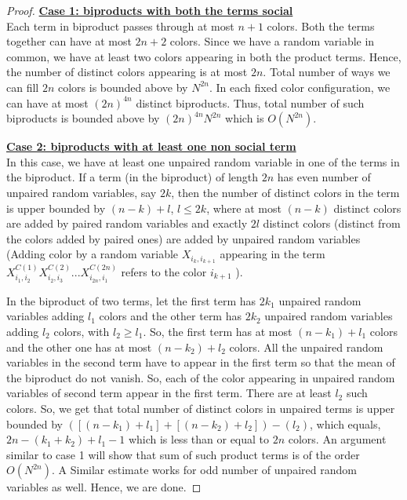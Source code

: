 \documentclass[12pt]{amsart}
\theoremstyle{definition}
\theoremstyle{remark}
\begin{document}
\begin{proof}
\textbf{\underline{Case 1: biproducts with both the terms social}}\\
Each term in biproduct passes through at most $n+1$ colors. Both the terms together can have at most $2n+2$ colors. Since we have a random variable in common, we have at least two colors appearing in both the product terms. Hence, the number of distinct colors appearing is at most $2n$. Total number of ways we can fill $2n$ colors is bounded above by $N^{2n}$. In each fixed color configuration, we can have at most $(2n)^{4n}$ distinct biproducts. Thus, total number of such biproducts is bounded above by $(2n)^{4n}N^{2n}$ which is $O(N^{2n})$.\par
\textbf{\underline{Case 2: biproducts with at least one non social term}}\\
In this case, we have at least one unpaired random variable in one of the terms in the biproduct. If a term (in the biproduct) of length $2n$ has even number of unpaired random variables, say $2k$, then the number of distinct colors in the term is upper bounded by $(n-k) + l$, $l \leq 2k$, where at most $(n-k)$ distinct colors are added by paired random variables and exactly $2l$ distinct colors (distinct from the colors added by paired ones) are added by unpaired random variables (Adding color by a random variable $X_{i_k,i_{k+1}}$ appearing in the term $X_{i_1,i_2}^{C(1)}X_{i_2,i_3}^{C(2)}...X_{i_{2n},i_{1}}^{C(2n)}$ refers to the color $i_{k+1}$ ). \par
In the biproduct of two terms, let the first term has $2k_1$ unpaired random variables adding $l_1$ colors and the other term has $2k_2$ unpaired random variables adding $l_2$ colors, with $l_2 \geq l_1$. So, the first term has at most $(n-k_1)+l_1$ colors and the other one has at most $(n-k_2)+l_2$ colors. All the unpaired random variables in the second term have to appear in the first term so that the mean of the biproduct do not vanish. So, each of the color appearing in unpaired random variables of second term appear in the first term. There are at least $l_2$ such colors. So, we get that total number of distinct colors in unpaired terms is upper bounded by $([(n-k_1)+l_1]+[(n-k_2)+l_2]) - (l_2)$, which equals, $2n-(k_1+k_2)+l_1-1$ which is less than or equal to $2n$ colors. An argument similar to case 1 will show that sum of such product terms is of the order $O(N^{2n})$. A Similar estimate works for odd number of unpaired random variables as well. Hence, we are done.
\end{proof}
\end{document}
